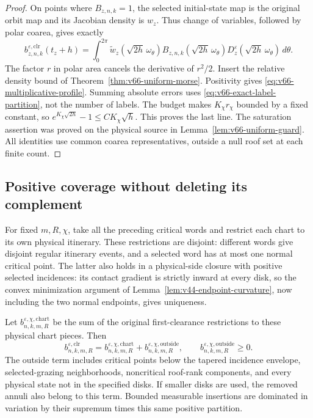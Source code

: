 \begin{proof}
On points where $B_{z,n,k}=1$, the selected initial-state map is the
original orbit map and its Jacobian density is $w_z$. Thus change of
variables, followed by polar coarea, gives exactly
\begin{equation}\label{eq:v66-exact-angular-coarea}
 b_{z,n,k}^{\varepsilon,\mathrm{clr}}(t_z+h)=
 \int_0^{2\pi}\widetilde w_z(\sqrt{2h}\,\omega_\theta)
 B_{z,n,k}(\sqrt{2h}\,\omega_\theta)
 D_z^\varepsilon(\sqrt{2h}\,\omega_\theta)\,d\theta.
\end{equation}
The factor $r$ in polar area cancels the derivative of $r^2/2$.
Insert the relative density bound of
Theorem~\ref{thm:v66-uniform-morse}. Positivity gives
\eqref{eq:v66-multiplicative-profile}. Summing absolute errors uses
\eqref{eq:v66-exact-label-partition}, not the number of labels.
The budget makes $K_\chi r_\chi$ bounded by a fixed constant, so
$e^{K_\chi\sqrt{2h}}-1\le C K_\chi\sqrt h$. This proves the last
line. The saturation assertion was proved on the physical source in
Lemma~\ref{lem:v66-uniform-guard}. All identities use common coarea
representatives, outside a null roof set at each finite count.
\end{proof}

\subsection{Positive coverage without deleting its complement}
For fixed $m,R,\chi$, take all the preceding critical words and restrict
each chart to its own physical itinerary. These restrictions are
disjoint: different words give disjoint regular itinerary events, and
a selected word has at most one normal critical point. The latter
also holds in a physical-side closure with positive selected incidences:
its contact gradient is strictly inward at every disk, so the convex
minimization argument of Lemma~\ref{lem:v44-endpoint-curvature}, now
including the two normal endpoints, gives uniqueness.

Let $b^{\varepsilon,\chi,\mathrm{chart}}_{n,k,m,R}$ be the sum of
the original first-clearance restrictions to these physical chart
pieces. Then
\begin{equation}\label{eq:v66-complete-positive-partition}
 b^{\varepsilon,\mathrm{clr}}_{n,k,m,R}
 =b^{\varepsilon,\chi,\mathrm{chart}}_{n,k,m,R}
                  +b^{\varepsilon,\chi,\mathrm{outside}}_{n,k,m,R},
           \qquad b^{\varepsilon,\chi,\mathrm{outside}}_{n,k,m,R}\ge0.
\end{equation}
The outside term includes critical points below the tapered incidence
envelope, selected-grazing neighborhoods, noncritical roof-rank
components, and every physical state not in the specified disks.
If smaller disks are used, the removed annuli also belong to this term.
Bounded measurable insertions are dominated in variation by their
supremum times this same positive partition.

